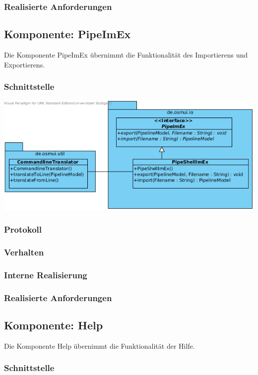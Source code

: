 \documentclass[a4paper,12pt]{scrartcl}
\begin{document}
\subsubsection{Realisierte Anforderungen}


\subsection{Komponente: PipeImEx}
Die Komponente PipeImEx übernimmt die Funktionalität des Importierens und Exportierens.
\subsubsection{Schnittstelle}
\begin{center}
\includegraphics[width=17cm]{Schnittstelle_PipeImEx.png}
\end{center}
\subsubsection{Protokoll}
\subsubsection{Verhalten}
\subsubsection{Interne Realisierung}
\subsubsection{Realisierte Anforderungen}


\subsection{Komponente: Help}
Die Komponente Help übernimmt die Funktionalität der Hilfe.
\subsubsection{Schnittstelle}
\end{document}
